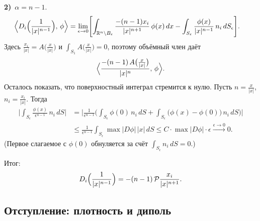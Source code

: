 \documentclass[12pt,a4paper]{article}
\begin{document}
{\medskip
\noindent\textbf{2)}\ \(\alpha = n-1\).
\begin{align*}
\Bigl\langle
    D_i\Bigl(\frac{1}{|x|^{n-1}}\Bigr),\,
    \phi
\Bigr\rangle
&=
\lim_{\epsilon\to 0}
\Biggl[
    \int_{\mathbb{R}^n \setminus B_\epsilon}
        \frac{-(n-1)x_i}{|x|^{n+1}}\,
        \phi(x)\,dx
    -
    \int_{S_\epsilon}
        \frac{\phi(x)}{|x|^{n-1}}\,
        n_i\,dS_\epsilon
\Biggr].
\end{align*}
Здесь
\(\frac{x_i}{|x|} = A\bigl(\tfrac{x}{|x|}\bigr)\)
и
\(\displaystyle \int_{S_1} A\bigl(\tfrac{x}{|x|}\bigr) = 0\),
поэтому объёмный член даёт
\[
\Bigl\langle
    \frac{-(n-1)\, A\bigl(\tfrac{x}{|x|}\bigr)}{|x|^n},\,
    \phi
\Bigr\rangle.
\]
Осталось показать, что поверхностный интеграл стремится к нулю.
Пусть \(n = \frac{x}{|x|}\), \(n_i = \frac{x_i}{|x|}\). Тогда
\begin{align*}
\Biggl|
\int_{S_\epsilon}
    \frac{\phi(x)}{\epsilon^{n-1}}\, n_i\,dS
\Biggr|
&=
\Biggl|
\frac{1}{\epsilon^{n-1}}
\Biggl(
    \int_{S_\epsilon} \phi(0)\, n_i\,dS
    +
    \int_{S_\epsilon} \bigl(\phi(x)-\phi(0)\bigr)\, n_i\,dS
\Biggr)
\Biggr| \\[3pt]
&\le
\frac{1}{\epsilon^{n-1}}
\int_{S_\epsilon} \max|D\phi|\, |x|\,dS
\le
C \cdot \max|D\phi| \cdot \epsilon
\xrightarrow{\epsilon\to 0} 0.
\end{align*}
(Первое слагаемое с \(\phi(0)\) обнуляется за счёт
\(\int_{S_\epsilon} n_i\,dS = 0\).)

Итог:
\[
D_i\Bigl(\frac{1}{|x|^{n-1}}\Bigr)
=
-(n-1)\,
\mathcal{P} \frac{x_i}{|x|^{n+1}}.
\]
}

\subsection{Отступление: плотность и диполь}

\end{document}
